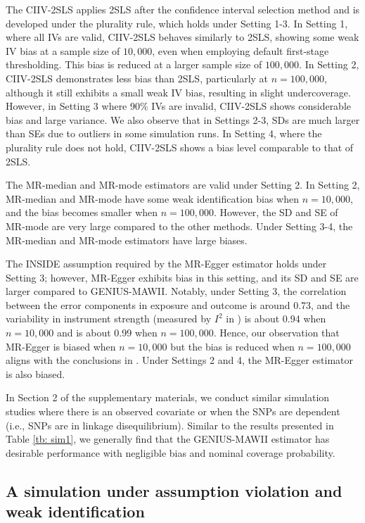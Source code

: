 \documentclass[12pt]{article}
\begin{document}
{{The CIIV-2SLS applies 2SLS after the confidence interval selection method and is developed under the plurality rule, which holds under Setting 1-3. In Setting 1, where all IVs are valid, CIIV-2SLS behaves similarly to 2SLS, showing some weak IV bias at a sample size of $10,000$, even when employing default first-stage thresholding. This bias is reduced at a larger sample size of $100,000$. In Setting 2, CIIV-2SLS demonstrates less bias than 2SLS, particularly at $n=100,000$, although it still exhibits a small weak IV bias, resulting in slight undercoverage. However, in Setting 3 where 90\% IVs are invalid, CIIV-2SLS shows considerable bias and large variance. We also observe that in Settings 2-3, SDs are much larger than SEs due to outliers in some simulation runs. In Setting 4, where the plurality rule does not hold, 
CIIV-2SLS shows a bias level comparable to that of 2SLS. 
}


The MR-median and MR-mode estimators are valid under Setting 2. In Setting 2, MR-median and MR-mode have some weak identification bias when $n=10,000$, and the bias becomes smaller when $n=100,000$. However, the SD and SE of MR-mode are very large compared to the other methods. Under Setting 3-4, the MR-median and MR-mode estimators have large biases. 

{The INSIDE assumption required by the MR-Egger estimator holds under Setting 3; however, MR-Egger exhibits bias in this setting, and its SD and SE are larger compared to GENIUS-MAWII. Notably, under Setting 3, the correlation between the error components in exposure and outcome is around 0.73, and the variability in instrument strength (measured by $I^2$ in \cite{minelli2021use}) is about 0.94  when $n=10,000$ and is about 0.99 when $n=100,000$. Hence, our observation that MR-Egger is biased when $n=10,000$ but the bias is reduced when $n=100,000$ aligns with the conclusions in \cite{minelli2021use}.  Under Settings 2 and 4, the MR-Egger estimator is also biased.}




In Section 2 of the supplementary materials, we conduct similar simulation studies where there is an observed covariate or when the SNPs are dependent (i.e., SNPs are in linkage disequilibrium).  Similar to the results presented in Table \ref{tb: sim1}, we generally find that the GENIUS-MAWII estimator has desirable performance with negligible bias and nominal coverage probability. 

\vspace{-3mm}
\subsection{A simulation under assumption violation and weak identification} \label{subsec: simu2}

}
\end{document}
